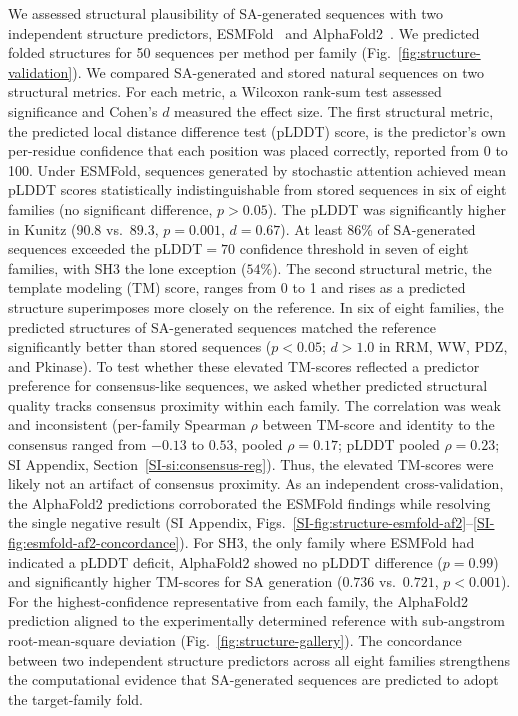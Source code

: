 \documentclass[11pt,onecolumn,twoside,lineno]{pnas-new}
\begin{document}
We assessed structural plausibility of SA-generated sequences with two independent structure predictors, ESMFold~\cite{linEvolutionaryScaleModeling2023} and AlphaFold2~\cite{jumperHighlyAccurateProtein2021}. We predicted folded structures for 50 sequences per method per family (Fig.~\ref{fig:structure-validation}). We compared SA-generated and stored natural sequences on two structural metrics. For each metric, a Wilcoxon rank-sum test assessed significance and Cohen's $d$ measured the effect size. The first structural metric, the predicted local distance difference test (pLDDT) score, is the predictor's own per-residue confidence that each position was placed correctly, reported from 0 to 100. Under ESMFold, sequences generated by stochastic attention achieved mean pLDDT scores statistically indistinguishable from stored sequences in six of eight families (no significant difference, $p > 0.05$). The pLDDT was significantly higher in Kunitz ($90.8$ vs.\ $89.3$, $p{=}0.001$, $d{=}0.67$). At least 86\% of SA-generated sequences exceeded the pLDDT${=}70$ confidence threshold in seven of eight families, with SH3 the lone exception ($54\%$). The second structural metric, the template modeling (TM) score, ranges from 0 to 1 and rises as a predicted structure superimposes more closely on the reference. In six of eight families, the predicted structures of SA-generated sequences matched the reference significantly better than stored sequences ($p < 0.05$; $d > 1.0$ in RRM, WW, PDZ, and Pkinase). To test whether these elevated TM-scores reflected a predictor preference for consensus-like sequences, we asked whether predicted structural quality tracks consensus proximity within each family. The correlation was weak and inconsistent (per-family Spearman $\rho$ between TM-score and identity to the consensus ranged from $-0.13$ to $0.53$, pooled $\rho{=}0.17$; pLDDT pooled $\rho{=}0.23$; SI Appendix, Section~\ref{SI-si:consensus-reg}). Thus, the elevated TM-scores were likely not an artifact of consensus proximity. As an independent cross-validation, the AlphaFold2 predictions corroborated the ESMFold findings while resolving the single negative result (SI Appendix, Figs.~\ref{SI-fig:structure-esmfold-af2}--\ref{SI-fig:esmfold-af2-concordance}). For SH3, the only family where ESMFold had indicated a pLDDT deficit, AlphaFold2 showed no pLDDT difference ($p{=}0.99$) and significantly higher TM-scores for SA generation ($0.736$ vs.\ $0.721$, $p < 0.001$). For the highest-confidence representative from each family, the AlphaFold2 prediction aligned to the experimentally determined reference with sub-angstrom root-mean-square deviation (Fig.~\ref{fig:structure-gallery}). The concordance between two independent structure predictors across all eight families strengthens the computational evidence that SA-generated sequences are predicted to adopt the target-family fold.
\end{document}
